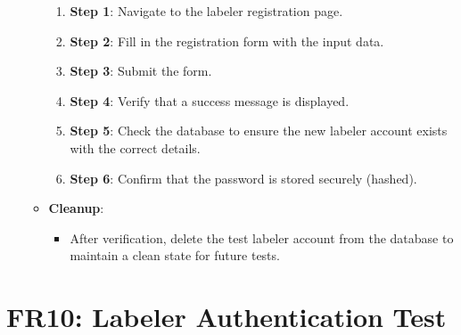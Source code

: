 \documentclass[12pt, titlepage]{article}
\begin{document}
\begin{enumerate}
\begin{itemize}
        \begin{enumerate}
            \item \textbf{Step 1}: Navigate to the labeler registration page.
            \item \textbf{Step 2}: Fill in the registration form with the input data.
            \item \textbf{Step 3}: Submit the form.
            \item \textbf{Step 4}: Verify that a success message is displayed.
            \item \textbf{Step 5}: Check the database to ensure the new labeler account exists with the correct details.
            \item \textbf{Step 6}: Confirm that the password is stored securely (hashed).
        \end{enumerate}
        \item \textbf{Cleanup}:
        \begin{itemize}
            \item After verification, delete the test labeler account from the database to maintain a clean state for future tests.
        \end{itemize}
    \end{itemize}
\end{enumerate}

\section*{FR10: Labeler Authentication Test}
\end{document}

